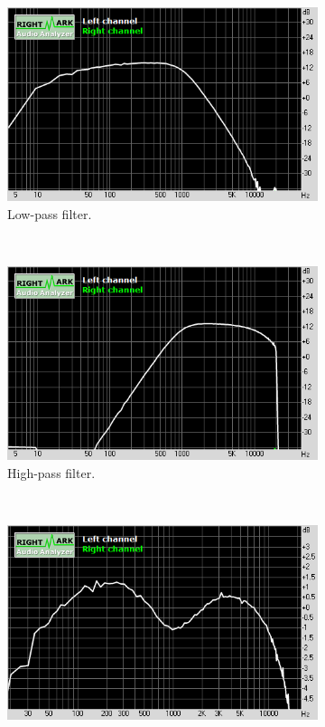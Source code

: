 \documentclass[a4paper,twoside,12pt]{book}
\begin{document}
\begin{figure}[h]
    \centering
    \begin{subfigure}[t]{0.45\textwidth}
        \includegraphics[width=\textwidth]{images/0_LPF}
        \caption{Low-pass filter.}
    \end{subfigure}
    ~
    \centering
    \begin{subfigure}[t]{0.45\textwidth}
        \includegraphics[width=\textwidth]{images/1_HPF}
        \caption{High-pass filter.}
    \end{subfigure}
    ~
    \centering
    \begin{subfigure}[t]{0.45\textwidth}
        \includegraphics[width=\textwidth]{images/3_peak_minus3}

\end{subfigure}
\end{figure}
\end{document}
